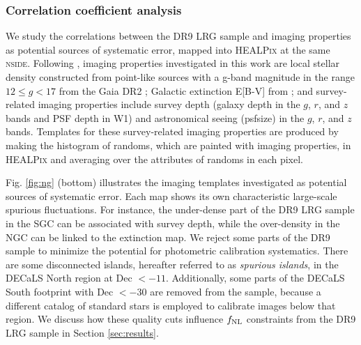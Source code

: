 \subsubsection{Correlation coefficient analysis}
We study the correlations between the DR9 LRG sample and imaging properties as potential sources of systematic error, mapped into \textsc{HEALPix} at the same \textsc{nside}. Following \cite{zhou2022target}, imaging properties investigated in this work are local stellar density constructed from point-like sources with a g-band magnitude in the range $12 \leq g < 17$ from the Gaia DR2 \citep[see,][]{gaiadr2, myers2022}; Galactic extinction E[B-V] from \cite{schlegel1998maps}; and survey-related imaging properties include survey depth (galaxy depth in the $g$, $r$, and $z$ bands and PSF depth in W1) and astronomical seeing (psfsize) in the $g$, $r$, and $z$ bands. Templates for these survey-related imaging properties are produced by making the histogram of randoms, which are painted with imaging properties, in \textsc{HEALPix} and averaging over the attributes of randoms in each pixel. 

Fig. \ref{fig:ng} (bottom) illustrates the imaging templates investigated as potential sources of systematic error. Each map shows its own characteristic large-scale spurious fluctuations. For instance, the under-dense part of the DR9 LRG sample in the SGC can be associated with survey depth, while the over-density in the NGC can be linked to the extinction map. We reject some parts of the DR9 sample to minimize the potential for photometric calibration systematics. There are some disconnected islands, hereafter referred to as \textit{spurious islands}, in the DECaLS North region at Dec $< -11$. Additionally, some parts of the DECaLS South footprint with Dec $< -30$ are removed from the sample, because a different catalog of standard stars is employed to calibrate images below that region. We discuss how these quality cuts influence $f_{\rm NL}$ constraints from the DR9 LRG sample in Section \ref{sec:results}. 

